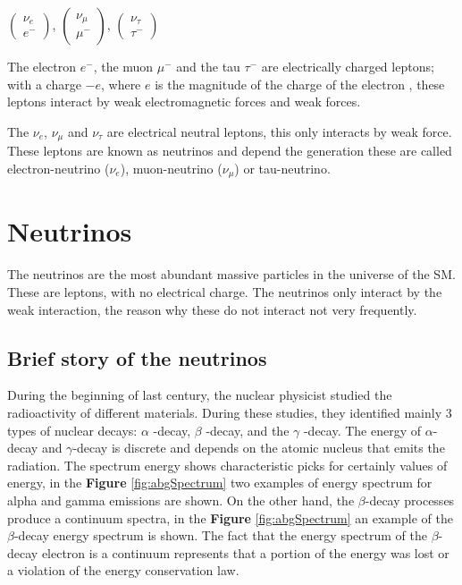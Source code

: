 $\begin{pmatrix}
    \nu_e \\
    e^-
\end{pmatrix}$, 
$\begin{pmatrix}
    \nu_\mu \\
    \mu^-
\end{pmatrix}$, 
$\begin{pmatrix}
    \nu_\tau \\
    \tau^-
\end{pmatrix}$

The electron $e^-$, the muon $\mu^-$ and the tau $\tau^-$ are electrically charged leptons; with a charge $-e$, where $e$ is the magnitude of the charge of the electron , these leptons interact by weak electromagnetic forces and weak forces. 

The $\nu_e$, $\nu_\mu$ and $\nu_\tau$ are electrical neutral leptons, this only interacts by weak force. These leptons are known as neutrinos and depend the generation these are called electron-neutrino ($\nu_e$), muon-neutrino ($\nu_\mu$) or tau-neutrino. 

\section{Neutrinos}
The neutrinos are the most abundant massive particles in the universe of the SM. These are leptons, with no electrical charge. The neutrinos only interact by the weak interaction, the reason why these do not interact not very frequently. 

\subsection{Brief story of the neutrinos}
During the beginning of last century, the nuclear physicist studied the radioactivity of different materials. During these studies, they identified mainly 3 types of nuclear decays: $\alpha$ -decay, $\beta$ -decay, and the $\gamma$ -decay. The energy of $\alpha$-decay and $\gamma$-decay is discrete and depends on the atomic nucleus that emits the radiation. The spectrum energy shows characteristic picks for certainly values of energy, in the \textbf{Figure} \ref{fig:abgSpectrum} two examples of energy spectrum for alpha and gamma emissions are shown. On the other hand, the $\beta$-decay processes produce a continuum spectra, in the \textbf{Figure} \ref{fig:abgSpectrum} an example of the $\beta$-decay energy spectrum is shown. The fact that the energy spectrum of the $\beta$-decay electron is a continuum represents that a portion of the energy was lost or a violation of the energy conservation law.


